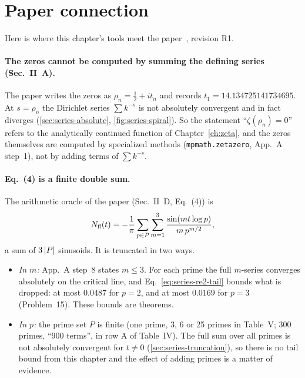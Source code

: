 \section{Paper connection}\label{sec:series-paper}

Here is where this chapter's tools meet the paper~\cite{soniR1}, revision R1.

\paragraph{The zeros cannot be computed by summing the defining series (Sec.~II~A).} The paper writes the zeros as $\rho_n=\tfrac12+it_n$ and records $t_1=14.134725141734695$. At $s=\rho_n$ the Dirichlet series $\sum k^{-s}$ is not absolutely convergent and in fact diverges (\cref{sec:series-absolute}, \cref{fig:series-spiral}). So the statement ``$\zeta(\rho_n)=0$'' refers to the analytically continued function of Chapter~\ref{ch:zeta}, and the zeros themselves are computed by specialized methods (\texttt{mpmath.zetazero}, App.~A step~1), not by adding terms of $\sum k^{-s}$.

\paragraph{Eq.~(4) is a finite double sum.} The arithmetic oracle of the paper (Sec.~II~D, Eq.~(4)) is
\[
N_{\rm fl}(t)=-\frac1\pi\sum_{p\in P}\sum_{m=1}^{3}\frac{\sin(mt\log p)}{m\,p^{m/2}},
\]
a sum of $3\left\lvert P\right\rvert$ sinusoids. It is truncated in two ways.
\begin{itemize}
\item \emph{In $m$:} App.~A step~8 states $m\le3$. For each prime the full $m$-series converges absolutely on the critical line, and Eq.~\eqref{eq:series-re2-tail} bounds what is dropped: at most $0.0487$ for $p=2$, and at most $0.0169$ for $p=3$ (Problem~15). These bounds are theorems.
\item \emph{In $p$:} the prime set $P$ is finite (one prime, 3, 6 or 25 primes in Table~V; 300 primes, ``900 terms'', in row A of Table~IV). The full sum over all primes is not absolutely convergent for $t\ne0$ (\cref{sec:series-truncation}), so there is no tail bound from this chapter and the effect of adding primes is a matter of evidence.
\end{itemize}

